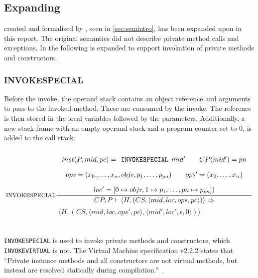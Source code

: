 \subsection{Expanding \jcl}
\jcl created and formalised by \cite{javasec}, seen in \cref{sec:semintro}, has been expanded upon in this report. The original semantics did not describe private method calls and exceptions. In the following \jcl is expanded to support invokation of private methods and constructors.

\subsubsection{INVOKESPECIAL}
Before the invoke, the operand stack contains an object reference and arguments to pass to the invoked method. These are consumed by the invoke. The reference is then stored in the local variables followed by the parameters. Additionally, a new stack frame with an empty operand stack and a program counter set to $0$, is added to the call stack.\\\\
$$\inference[INVOKESPECIAL]{
inst(P,mid,pc) = \texttt{INVOKESPECIAL }mid' \semsp 
CP(mid') = pn \semnl \\
ops = (x_0, \ldots, x_n, objr, p_1, \ldots, p_{pn}) \semsp
ops' = (x_0, \ldots, x_{n}) \semnl\\
loc' = [0 \mapsto objr, 1 \mapsto p_{1}, \ldots, pn \mapsto p_{pn}])}
{CP, P \vdash \langle H, (CS, \langle mid, loc, ops, pc \rangle)\rangle \Rightarrow }$$
$$\langle H, (CS, \langle mid, loc, ops', pc \rangle, \langle mid', loc', \epsilon, 0 \rangle)\rangle$$\\\\
\texttt{INVOKESPECIAL} is used to invoke private methods and constructors, which \texttt{INVOKEVIRTUAL} is not. The \jc Virtual Machine specification v2.2.2 states that ``Private instance methods and all constructors are not virtual methods, but instead are resolved statically during compilation.''~\cite[chap. 4.3.7.6]{java_card_spec}.


